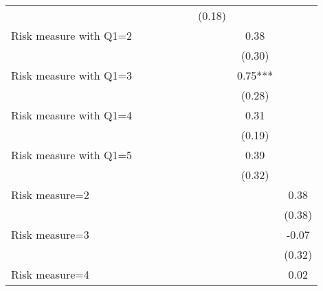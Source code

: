 \begin{table}[htbp]
\begin{threeparttable}
\begin{tabular}{l cccccccc}
                    &               &               &               &               &               &      (0.18)   &               &               \\
Risk measure with Q1=2&               &               &               &               &               &               &        0.38   &               \\
                    &               &               &               &               &               &               &      (0.30)   &               \\
Risk measure with Q1=3&               &               &               &               &               &               &        0.75***&               \\
                    &               &               &               &               &               &               &      (0.28)   &               \\
Risk measure with Q1=4&               &               &               &               &               &               &        0.31   &               \\
                    &               &               &               &               &               &               &      (0.19)   &               \\
Risk measure with Q1=5&               &               &               &               &               &               &        0.39   &               \\
                    &               &               &               &               &               &               &      (0.32)   &               \\
Risk measure=2      &               &               &               &               &               &               &               &        0.38   \\
                    &               &               &               &               &               &               &               &      (0.38)   \\
Risk measure=3      &               &               &               &               &               &               &               &       -0.07   \\
                    &               &               &               &               &               &               &               &      (0.32)   \\
Risk measure=4      &               &               &               &               &               &               &               &        0.02   \\

\end{tabular}
\end{threeparttable}
\end{table}
